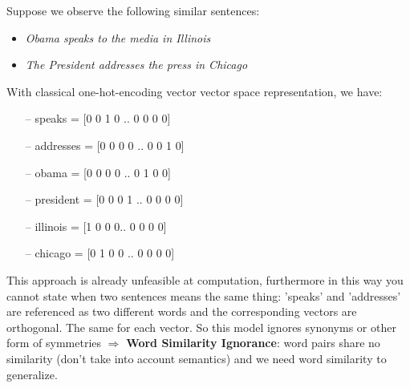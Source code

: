
Suppose we observe the following similar sentences:
\begin{itemize}
    \item \textit{Obama speaks to the media in Illinois}
    \item \textit{The President addresses the press in Chicago}
\end{itemize}{}
With classical one-hot-encoding vector vector space representation, we have:
\begin{itemize}
    \item[--] speaks = [0 0 1 0 .. 0 0 0 0]
    \item[--] addresses = [0 0 0 0 .. 0 0 1 0]
    \item[--] obama = [0 0 0 0 .. 0 1 0 0]
    \item[--] president = [0 0 0 1 .. 0 0 0 0]
    \item[--] illinois = [1 0 0 0.. 0 0 0 0]
    \item[--] chicago = [0 1 0 0 .. 0 0 0 0]
\end{itemize}{}
This approach is already unfeasible at computation, furthermore in this way you cannot state when two sentences means the same thing: 'speaks' and 'addresses' are referenced as two different words and the corresponding vectors are orthogonal. The same for each vector. So this model ignores synonyms or other form of symmetries $\Rightarrow$ \textbf{Word Similarity Ignorance}: word pairs share no similarity (don't take into account semantics) and we need word similarity to generalize.\\


